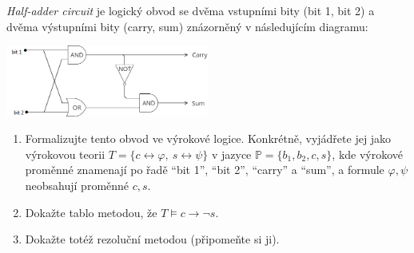 \documentclass[a4paper,12pt]{article}
\begin{document}
\medskip\begin{problem}
    \emph{Half-adder circuit} je logický obvod se dvěma vstupními bity (bit 1, bit 2) a dvěma výstupními bity (carry, sum) znázorněný v následujícím diagramu:
    \begin{center}
        \includegraphics[width=0.5\textwidth]{files/half-adder.png}
    \end{center}
    \begin{enumerate}
            \item Formalizujte tento obvod ve výrokové logice. Konkrétně, vyjádřete jej jako výrokovou teorii $T=\{c\leftrightarrow \varphi,\ s\leftrightarrow \psi\}$ v jazyce $\mathbb P=\{b_1,b_2,c,s\}$, kde výrokové proměnné znamenají po řadě ``bit 1'', ``bit 2'', ``carry'' a ``sum'', a formule $\varphi,\psi$ neobsahují proměnné $c,s$.
            \item Dokažte tablo metodou, že $T\models c\to\neg s$.
            \item Dokažte totéž rezoluční metodou (připomeňte si ji).
    \end{enumerate}
    \end{problem}
\end{document}

